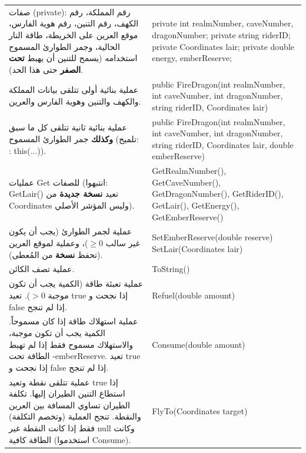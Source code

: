 \documentclass[14pt]{extarticle}
\begin{document}
\begin{enumerate}[label=\textbf{تمرين \arabic*:}, wide=0pt, leftmargin=*, itemsep=2.2em]
    {\centering
    \renewcommand{\arraystretch}{1.2}
    \small
    \begin{tabular}{|>{\raggedleft\arraybackslash}p{}|>{\raggedright\arraybackslash}p{}|}
    \hline
    \multicolumn{2}{|c|}{\textbf{الفئة: \textenglish{FireDragon}}} \\
    \hline
    صفات (\textenglish{private}): رقم المملكة، رقم الكهف، رقم التنين، رقم هوية الفارس، موقع العرين على الخريطة، طاقة النار الحالية، وجمر الطوارئ المسموح استخدامه (يسمح للتنين أن يهبط \textbf{تحت الصفر} حتى هذا الحد). & \textenglish{private int realmNumber, caveNumber, dragonNumber;} \newline \textenglish{private string riderID;} \newline \textenglish{private Coordinates lair;} \newline \textenglish{private double energy, emberReserve;} \\
    \hline
    عملية بنائية أولى تتلقى بيانات المملكة والكهف والتنين وهوية الفارس والعرين. & \textenglish{public FireDragon(int realmNumber, int caveNumber, int dragonNumber, string riderID, Coordinates lair)} \\
    \hline
    عملية بنائية ثانية تتلقى كل ما سبق \textbf{وكذلك} جمر الطوارئ المسموح (تلميح: \textenglish{: this(...)}). & \textenglish{public FireDragon(int realmNumber, int caveNumber, int dragonNumber, string riderID, Coordinates lair, double emberReserve)} \\
    \hline
    عمليات \textenglish{Get} للصفات (انتبهوا: \textenglish{GetLair()} تعيد \textbf{نسخة جديدة} من \textenglish{Coordinates} وليس المؤشر الأصلي). & \textenglish{GetRealmNumber(), GetCaveNumber(), GetDragonNumber(), GetRiderID(), GetLair(), GetEnergy(), GetEmberReserve()} \\
    \hline
    عملية لجمر الطوارئ (يجب أن يكون غير سالب $\ge 0$)، وعملية لموقع العرين (تحفظ \textbf{نسخة} من المُعطى). & \textenglish{SetEmberReserve(double reserve)} \newline \textenglish{SetLair(Coordinates lair)} \\
    \hline
    عملية تصف الكائن. & \textenglish{ToString()} \\
    \hline
    عملية تعبئة طاقة (الكمية يجب أن تكون موجبة $> 0$). تعيد \textenglish{true} إذا نجحت و \textenglish{false} إذا لم تنجح. & \textenglish{Refuel(double amount)} \\
    \hline
    عملية استهلاك طاقة إذا كان مسموحاً. الكمية يجب أن تكون موجبة، والاستهلاك مسموح فقط إذا لم تهبط الطاقة تحت \textenglish{-emberReserve}. تعيد \textenglish{true} إذا نجحت و \textenglish{false} إذا لم تنجح. & \textenglish{Consume(double amount)} \\
    \hline
    عملية تتلقى نقطة وتعيد \textenglish{true} إذا استطاع التنين الطيران إليها. تكلفة الطيران تساوي المسافة بين العرين والنقطة. تنجح العملية (وتخصم التكلفة) فقط إذا كانت النقطة غير \textenglish{null} وكانت الطاقة كافية (استخدموا \textenglish{Consume}). & \textenglish{FlyTo(Coordinates target)} \\
    \hline
    \end{tabular}
    \par} %


\end{enumerate}
\end{document}
